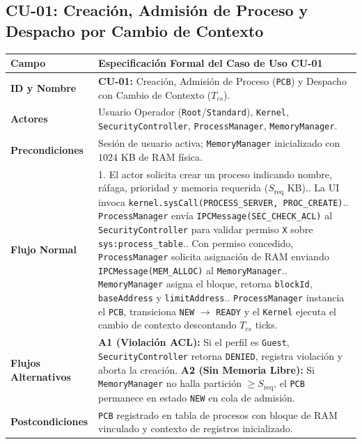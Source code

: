 \documentclass[10pt,twocolumn,letterpaper]{article}
\begin{document}
\subsection{CU-01: Creaci\'on, Admisi\'on de Proceso y Despacho por Cambio de Contexto}
\begin{table}[!htb]
\centering
\scriptsize
\renewcommand{\arraystretch}{1.12}
\begin{tabularx}{\columnwidth}{L{2.1cm} Y}
\toprule
\textbf{Campo} & \textbf{Especificaci\'on Formal del Caso de Uso CU-01} \\
\midrule
\textbf{ID y Nombre} & \textbf{CU-01:} Creaci\'on, Admisi\'on de Proceso (\texttt{PCB}) y Despacho con Cambio de Contexto ($T_{cs}$). \\
\textbf{Actores} & Usuario Operador (\texttt{Root}/\texttt{Standard}), \texttt{Kernel}, \texttt{SecurityController}, \texttt{ProcessManager}, \texttt{MemoryManager}. \\
\textbf{Precondiciones} & Sesi\'on de usuario activa; \texttt{MemoryManager} inicializado con $1024$ KB de RAM f\'isica. \\
\textbf{Flujo Normal} & 1. El actor solicita crear un proceso indicando nombre, r\'afaga, prioridad y memoria requerida ($S_{\text{req}}$ KB).. La UI invoca \texttt{kernel.sysCall(PROCESS\_SERVER, PROC\_CREATE)}.. \texttt{ProcessManager} env\'ia \texttt{IPCMessage(SEC\_CHECK\_ACL)} al \texttt{SecurityController} para validar permiso \texttt{X} sobre \texttt{sys:process\_table}.. Con permiso concedido, \texttt{ProcessManager} solicita asignaci\'on de RAM enviando \texttt{IPCMessage(MEM\_ALLOC)} al \texttt{MemoryManager}.. \texttt{MemoryManager} asigna el bloque, retorna \texttt{blockId}, \texttt{baseAddress} y \texttt{limitAddress}.. \texttt{ProcessManager} instancia el \texttt{PCB}, transiciona \texttt{NEW} $\rightarrow$ \texttt{READY} y el \texttt{Kernel} ejecuta el cambio de contexto descontando $T_{cs}$ ticks. \\
\textbf{Flujos Alternativos} & \textbf{A1 (Violaci\'on ACL):} Si el perfil es \texttt{Guest}, \texttt{SecurityController} retorna \texttt{DENIED}, registra violaci\'on y aborta la creaci\'on.\newline
\textbf{A2 (Sin Memoria Libre):} Si \texttt{MemoryManager} no halla partici\'on $\ge S_{\text{req}}$, el \texttt{PCB} permanece en estado \texttt{NEW} en cola de admisi\'on. \\
\textbf{Postcondiciones} & \texttt{PCB} registrado en tabla de procesos con bloque de RAM vinculado y contexto de registros inicializado. \\
\bottomrule
\end{tabularx}
\end{table}
\end{document}
